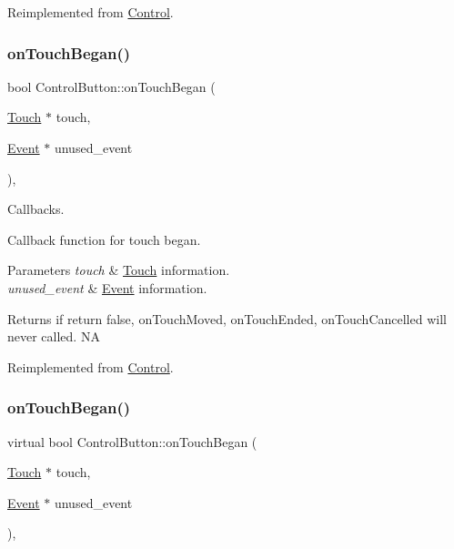 Reimplemented from \hyperlink{classControl_aa3c7bd1c9d2a072c037c6c9232a336a5}{Control}.

\mbox{\label{classControlButton_a1f4736ab73edd357bf9caf9fa0e1dcd6}} 
\subsubsection{\texorpdfstring{on\+Touch\+Began()}{onTouchBegan()}\hspace{0.1cm}{\footnotesize\ttfamily [1/2]}}
{\footnotesize\ttfamily bool Control\+Button\+::on\+Touch\+Began (\begin{DoxyParamCaption}\item[{\hyperlink{classTouch}{Touch} $\ast$}]{touch,  }\item[{\hyperlink{classEvent}{Event} $\ast$}]{unused\+\_\+event }\end{DoxyParamCaption})\hspace{0.3cm}{\ttfamily [override]}, {\ttfamily [virtual]}}



Callbacks. 

Callback function for touch began.


\begin{DoxyParams}{Parameters}
{\em touch} & \hyperlink{classTouch}{Touch} information. \\
\hline
{\em unused\+\_\+event} & \hyperlink{classEvent}{Event} information. \\
\hline
\end{DoxyParams}
\begin{DoxyReturn}{Returns}
if return false, on\+Touch\+Moved, on\+Touch\+Ended, on\+Touch\+Cancelled will never called.  NA 
\end{DoxyReturn}


Reimplemented from \hyperlink{classControl_a0cf2e20cea5b57b263e965be4a19ab52}{Control}.

\mbox{\label{classControlButton_a170cc0df0207fba7bc352acc6173d948}} 
\subsubsection{\texorpdfstring{on\+Touch\+Began()}{onTouchBegan()}\hspace{0.1cm}{\footnotesize\ttfamily [2/2]}}
{\footnotesize\ttfamily virtual bool Control\+Button\+::on\+Touch\+Began (\begin{DoxyParamCaption}\item[{\hyperlink{classTouch}{Touch} $\ast$}]{touch,  }\item[{\hyperlink{classEvent}{Event} $\ast$}]{unused\+\_\+event }\end{DoxyParamCaption})\hspace{0.3cm}{\ttfamily [override]}, {\ttfamily [virtual]}}



